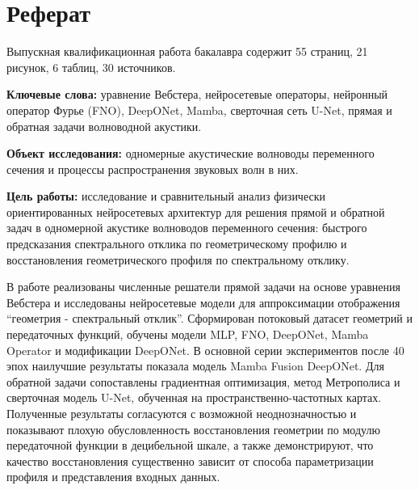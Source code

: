 \chapter*{Реферат}

Выпускная квалификационная работа бакалавра содержит 55 страниц, 21 рисунок, 6 таблиц, 30 источников.

\textbf{Ключевые слова:} уравнение Вебстера, нейросетевые операторы, нейронный оператор Фурье (FNO), DeepONet, Mamba, сверточная сеть U-Net, прямая и обратная задачи волноводной акустики.

\textbf{Объект исследования:} одномерные акустические волноводы переменного сечения и процессы распространения звуковых волн в них.

\textbf{Цель работы:} исследование и сравнительный анализ физически ориентированных нейросетевых архитектур для решения прямой и обратной задач в одномерной акустике волноводов переменного сечения: быстрого предсказания спектрального отклика по геометрическому профилю и восстановления геометрического профиля по спектральному отклику.

В работе реализованы численные решатели прямой задачи на основе уравнения Вебстера и исследованы нейросетевые модели для аппроксимации отображения ``геометрия - спектральный отклик''. Сформирован потоковый датасет геометрий и передаточных функций, обучены модели MLP, FNO, DeepONet, Mamba Operator и модификации DeepONet. В основной серии экспериментов после 40 эпох наилучшие результаты показала модель Mamba Fusion DeepONet. Для обратной задачи сопоставлены градиентная оптимизация, метод Метрополиса и сверточная модель U-Net, обученная на пространственно-частотных картах. Полученные результаты согласуются с возможной неоднозначностью и показывают плохую обусловленность восстановления геометрии по модулю передаточной функции в децибельной шкале, а также демонстрируют, что качество восстановления существенно зависит от способа параметризации профиля и представления входных данных.
